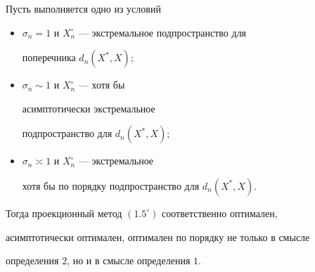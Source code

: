 \begin{thms}


Пусть выполняется одно из условий


\begin{itemize}


\item[а)] $\sigma_n=1$ и $X_n^\circ$ --- экстремальное подпространство для


поперечника $d_n(X^*,X);$


\item[б)] $\sigma_n\sim 1$ и $X_n^\circ$ --- хотя бы


асимптотически экстремальное


подпространство для $d_n(X^*,X);$


\item[в)] $\sigma_n\asymp 1$ и $X_n^\circ$ --- экстремальное


хотя бы по порядку подпространство для $d_n(X^*,X)$.


\end{itemize}


Тогда проекционный метод $(1.5^\circ)$ соответственно оптимален,


асимптотически оптимален, оптимален по порядку не только в смысле


определения $2$, но и в смысле определения $1$.


\end{thms}





